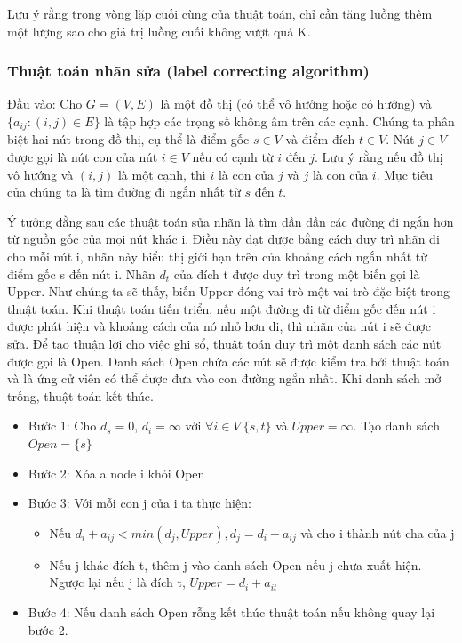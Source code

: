 \documentclass[a4paper]{article}
\begin{document}
    Lưu ý rằng trong vòng lặp cuối cùng của thuật toán, chỉ cần tăng luồng thêm một lượng sao cho giá trị luồng cuối không vượt quá K.

    \subsubsection{Thuật toán nhãn sửa (label correcting algorithm)}

    Đầu vào: Cho $G=(V,E)$ là một đồ thị (có thể vô hướng hoặc có hướng) và
    $\{ a_{ij}:(i,j) \in E \}$ là tập hợp các trọng số không âm trên các cạnh.
    Chúng ta phân biệt hai nút trong đồ thị, cụ thể là điểm gốc
    $s \in V$ và điểm đích $t \in V$. Nút
    $j \in V$ được gọi là nút con của nút $i \in V$ nếu có cạnh từ $i$ đến $j$.
    Lưu ý rằng nếu đồ thị vô hướng và $(i,j)$ là một cạnh, thì $i$ là con của $j$ và $j$ là con của $i$.
    Mục tiêu của chúng ta là tìm đường đi ngắn nhất từ $s$ đến $t$.
    
    Ý tưởng đằng sau các thuật toán sửa nhãn là tìm dần dần các đường đi ngắn hơn từ nguồn gốc của mọi nút khác i. 
    Điều này đạt được bằng cách duy trì nhãn di cho mỗi nút i, nhãn này biểu thị giới hạn trên của khoảng cách ngắn nhất từ điểm gốc s đến nút i. 
    Nhãn $d_t$ của đích t được duy trì trong một biến gọi là Upper. 
    Như chúng ta sẽ thấy, biến Upper đóng vai trò một vai trò đặc biệt trong thuật toán. 
    Khi thuật toán tiến triển, nếu một đường đi từ điểm gốc đến nút i được phát hiện và khoảng cách của nó nhỏ hơn di, thì nhãn của nút i sẽ được sửa. 
    Để tạo thuận lợi cho việc ghi sổ, thuật toán duy trì một danh sách các nút được gọi là Open. Danh sách Open chứa các nút sẽ được kiểm tra bởi
    thuật toán và là ứng cử viên có thể được đưa vào con đường ngắn nhất. Khi danh sách mở trống, thuật toán kết thúc.
    \begin{itemize}
        \item Bước 1: Cho $d_s = 0$, $d_i = \infty$ với $\forall i \in V \ \{s,t\}$ và $Upper = \infty$.
            Tạo danh sách $Open = \{s\}$
        \item Bước 2: Xóa a node i khỏi Open
        \item Bước 3: Với mỗi con j của i ta thực hiện:
            \begin{itemize}
                \item Nếu $d_i + a_{ij} < min (d_j, Upper), d_j = d_i + a_{ij}$ và cho i thành nút cha của j
                \item Nếu j khác đích t, thêm j vào danh sách Open nếu j chưa xuất hiện. Ngược lại nếu j là đích t, $Upper = d_i + a_{it}$
            \end{itemize}
        \item Bước 4: Nếu danh sách Open rỗng kết thúc thuật toán nếu không quay lại bước 2.
    \end{itemize}
\end{document}
